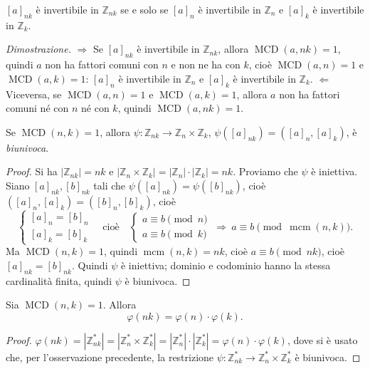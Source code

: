\documentclass[11pt,a4paper]{article}
\begin{document}
\begin{osservazione}
$[a]_{nk}$ è invertibile in $\mathbb{Z}_{nk}$ se e solo se $[a]_n$ è invertibile in $\mathbb{Z}_n$ e $[a]_k$ è invertibile in $\mathbb{Z}_k$.

\emph{Dimostrazione.} $\Rightarrow$ Se $[a]_{nk}$ è invertibile in $\mathbb{Z}_{nk}$, allora $\operatorname{MCD}(a, nk) = 1$, quindi $a$ non ha fattori comuni con $n$ e non ne ha con $k$, cioè $\operatorname{MCD}(a, n) = 1$ e $\operatorname{MCD}(a, k) = 1$: $[a]_n$ è invertibile in $\mathbb{Z}_n$ e $[a]_k$ è invertibile in $\mathbb{Z}_k$. $\Leftarrow$ Viceversa, se $\operatorname{MCD}(a, n) = 1$ e $\operatorname{MCD}(a, k) = 1$, allora $a$ non ha fattori comuni né con $n$ né con $k$, quindi $\operatorname{MCD}(a, nk) = 1$.
\end{osservazione}

\begin{proposizione}
Se $\operatorname{MCD}(n, k) = 1$, allora $\psi : \mathbb{Z}_{nk} \to \mathbb{Z}_n \times \mathbb{Z}_k$, $\psi([a]_{nk}) = ([a]_n, [a]_k)$, è \emph{biunivoca}.
\end{proposizione}

\begin{proof}
Si ha $|\mathbb{Z}_{nk}| = nk$ e $|\mathbb{Z}_n\times\mathbb{Z}_k| = |\mathbb{Z}_n|\cdot|\mathbb{Z}_k| = nk$. Proviamo che $\psi$ è iniettiva. Siano $[a]_{nk}, [b]_{nk}$ tali che $\psi([a]_{nk}) = \psi([b]_{nk})$, cioè $([a]_n, [a]_k) = ([b]_n, [b]_k)$, cioè
\[
  \begin{cases} [a]_n = [b]_n \\ [a]_k = [b]_k \end{cases}
  \quad\text{cioè}\quad
  \begin{cases} a \equiv b \pmod n \\ a \equiv b \pmod k \end{cases}
  \ \Rightarrow\ a \equiv b \pmod{\operatorname{mcm}(n, k)} .
\]
Ma $\operatorname{MCD}(n, k) = 1$, quindi $\operatorname{mcm}(n, k) = nk$, cioè $a \equiv b \pmod{nk}$, cioè $[a]_{nk} = [b]_{nk}$. Quindi $\psi$ è iniettiva; dominio e codominio hanno la stessa cardinalità finita, quindi $\psi$ è biunivoca.
\end{proof}

\begin{proposizione}
Sia $\operatorname{MCD}(n, k) = 1$. Allora
\[
  \varphi(nk) = \varphi(n)\cdot\varphi(k) .
\]
\end{proposizione}

\begin{proof}
$\varphi(nk) = |\mathbb{Z}_{nk}^*| = |\mathbb{Z}_n^*\times\mathbb{Z}_k^*| = |\mathbb{Z}_n^*|\cdot|\mathbb{Z}_k^*| = \varphi(n)\cdot\varphi(k)$, dove si è usato che, per l'osservazione precedente, la restrizione $\psi : \mathbb{Z}_{nk}^* \to \mathbb{Z}_n^*\times\mathbb{Z}_k^*$ è biunivoca.
\end{proof}
\end{document}

